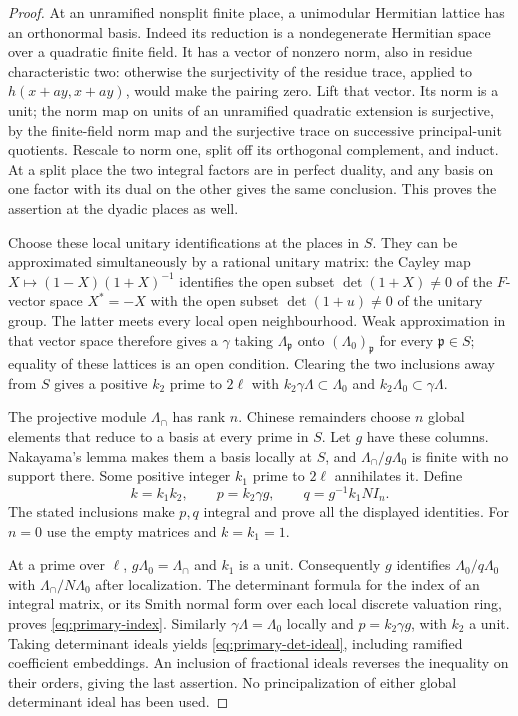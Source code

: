 \begin{proof}
At an unramified nonsplit finite place, a unimodular Hermitian lattice
has an orthonormal basis.  Indeed its reduction is a nondegenerate
Hermitian space over a quadratic finite field.  It has a vector of
nonzero norm, also in residue characteristic two: otherwise the
surjectivity of the residue trace, applied to
$h(x+ay,x+ay)$, would make the pairing zero.  Lift that vector.  Its
norm is a unit; the norm map on units of an unramified quadratic
extension is surjective, by the finite-field norm map and the
surjective trace on successive principal-unit quotients.  Rescale to
norm one, split off its orthogonal complement, and induct.  At a split
place the two integral factors are in perfect duality, and any basis
on one factor with its dual on the other gives the same conclusion.
This proves the assertion at the dyadic places as well.

Choose these local unitary identifications at the places in $S$.
They can be approximated simultaneously by a rational unitary matrix:
the Cayley map $X\mapsto(1-X)(1+X)^{-1}$ identifies the open subset
$\det(1+X)\ne0$ of the $F$-vector space $X^*=-X$ with the open subset
$\det(1+u)\ne0$ of the unitary group.  The latter meets every local open
neighbourhood.  Weak approximation in that vector space therefore
gives a $\gamma$ taking $\Lambda_{\mathfrak p}$ onto
$(\Lambda_0)_{\mathfrak p}$ for every $\mathfrak p\in S$; equality of
these lattices is an open condition.  Clearing the two inclusions away
from $S$ gives a positive $k_2$ prime to $2\ell$ with
$k_2\gamma\Lambda\subset\Lambda_0$ and
$k_2\Lambda_0\subset\gamma\Lambda$.

The projective module $\Lambda_\cap$ has rank $n$.  Chinese remainders
choose $n$ global elements that reduce to a basis at every prime in
$S$.  Let $g$ have these columns.  Nakayama's lemma makes them a basis
locally at $S$, and $\Lambda_\cap/g\Lambda_0$ is finite with no support
there.  Some positive integer $k_1$ prime to $2\ell$ annihilates it.
Define
\[
 k=k_1k_2,\qquad p=k_2\gamma g,\qquad q=g^{-1}k_1N I_n.
\]
The stated inclusions make $p,q$ integral and prove all the displayed
identities.  For $n=0$ use the empty matrices and $k=k_1=1$.

At a prime over $\ell$, $g\Lambda_0=\Lambda_\cap$ and $k_1$ is a unit.
Consequently $g$ identifies $\Lambda_0/q\Lambda_0$ with
$\Lambda_\cap/N\Lambda_0$ after localization.  The determinant formula
for the index of an integral matrix, or its Smith normal form over
each local discrete valuation ring, proves \eqref{eq:primary-index}.
Similarly $\gamma\Lambda=\Lambda_0$ locally and
$p=k_2\gamma g$, with $k_2$ a unit.  Taking determinant ideals yields
\eqref{eq:primary-det-ideal}, including ramified coefficient embeddings.
An inclusion of fractional ideals reverses the inequality on their
orders, giving the last assertion.  No principalization of either
global determinant ideal has been used.
\end{proof}

